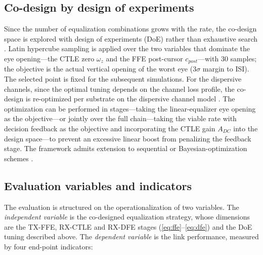 \documentclass[twocolumn]{USG}
\begin{document}
\subsection{Co-design by design of experiments}
Since the number of equalization combinations grows with the rate, the
co-design space is explored with design of experiments (DoE) rather than
exhaustive search \cite{7851249,5770781}. Latin hypercube sampling is
applied over the two variables that dominate the eye opening---the CTLE zero
$\omega_z$ and the FFE post-cursor $c_{post}$---with 30 samples; the
objective is the actual vertical opening of the worst eye ($3\sigma$ margin
to ISI). The selected point is fixed for the subsequent simulations. For the
dispersive channels, since the optimal tuning depends on the channel loss
profile, the co-design is re-optimized per substrate on the dispersive channel model
\cite{11169790}. The optimization can be performed in stages---taking the
linear-equalizer eye opening as the objective---or jointly over the full
chain---taking the viable rate with decision feedback as the objective and
incorporating the CTLE gain $A_{DC}$ into the design space---to prevent an
excessive linear boost from penalizing the feedback stage. The framework
admits extension to sequential or Bayesian-optimization schemes
\cite{11309336}.

\subsection{Evaluation variables and indicators}
The evaluation is structured on the operationalization of two variables. The
\emph{independent variable} is the co-designed equalization strategy, whose
dimensions are the TX-FFE, RX-CTLE and RX-DFE stages
(\eqref{eq:ffe}--\eqref{eq:dfe}) and the DoE tuning described above. The
\emph{dependent variable} is the link performance, measured by four
end-point indicators:
\end{document}
